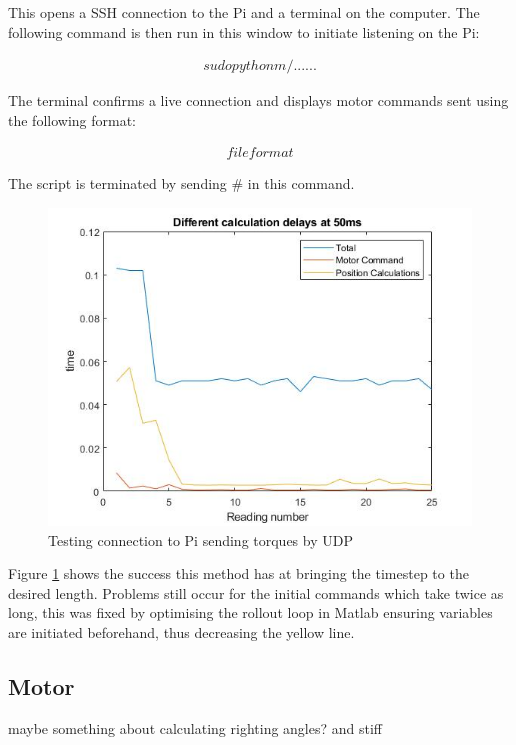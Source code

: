 \documentclass[twoside,twocolumn,12pt]{article}
\begin{document}
This opens a SSH connection to the Pi and a terminal on the computer. The following command is then run in this window to initiate listening on the Pi:

\begin{gather}
sudo python m/...... 
\end{gather}

The terminal confirms a live connection and displays motor commands sent using the following format:

\begin{gather}
file format
\end{gather}

The script is terminated by sending \# in this command.

\begin{figure}
  \centering
    \includegraphics[width=\linewidth]{50ms_udp}
  \caption{Testing connection to Pi sending torques by UDP}
  \label{fig:piudp}
\end{figure} 

Figure \ref{fig:piudp} shows the success this method has at bringing the timestep to the desired length. Problems still occur for the initial commands which take twice as long, this was fixed by optimising the rollout loop in Matlab ensuring variables are initiated beforehand, thus decreasing the yellow line.  

\subsection{Motor}
maybe something about calculating righting angles? and stiff
\end{document}
